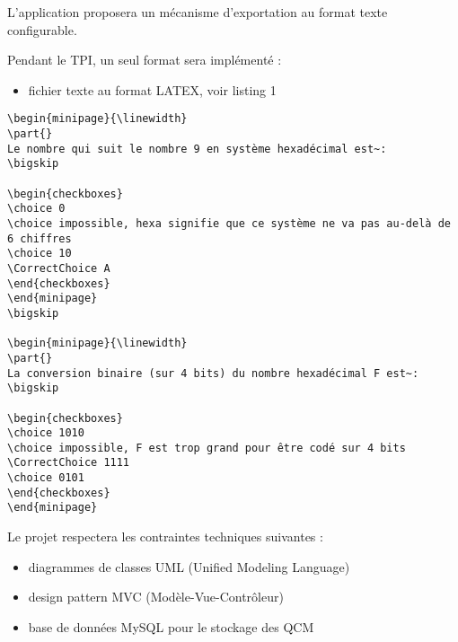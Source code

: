 \documentclass[a4paper]{article}
\begin{document}
	L’application proposera un mécanisme d’exportation au format texte configurable.
	
	Pendant le TPI, un seul format sera implémenté :
	\begin{itemize}
		\item fichier texte au format LATEX, voir listing 1
	\end{itemize}

\begin{lstlisting}[caption=Source QCM \LaTeX{}]
\begin{minipage}{\linewidth}
\part{}
Le nombre qui suit le nombre 9 en système hexadécimal est~:
\bigskip

\begin{checkboxes}
\choice 0
\choice impossible, hexa signifie que ce système ne va pas au-delà de 6 chiffres
\choice 10
\CorrectChoice A
\end{checkboxes}
\end{minipage}
\bigskip

\begin{minipage}{\linewidth}
\part{}
La conversion binaire (sur 4 bits) du nombre hexadécimal F est~:
\bigskip

\begin{checkboxes}
\choice 1010
\choice impossible, F est trop grand pour être codé sur 4 bits
\CorrectChoice 1111
\choice 0101
\end{checkboxes}
\end{minipage}
\end{lstlisting}

	\noindent
	Le projet respectera les contraintes techniques suivantes :
	
	\begin{itemize}
		\item diagrammes de classes UML (Unified Modeling Language)
		\item design pattern MVC (Modèle-Vue-Contrôleur)
		\item base de données MySQL pour le stockage des QCM
	\end{itemize}	
\end{document}
